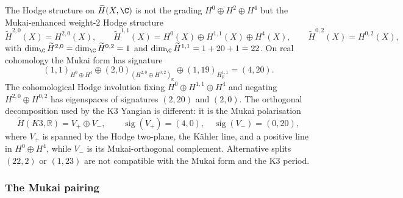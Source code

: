 The Hodge structure on $\widetilde H(X, \C)$ is not the grading $H^0 \oplus H^2 \oplus H^4$ but the Mukai-enhanced weight-$2$ Hodge structure
\[
 \widetilde H^{2, 0}(X) = H^{2, 0}(X), \qquad
 \widetilde H^{1, 1}(X) = H^0(X) \oplus H^{1, 1}(X) \oplus H^4(X), \qquad
 \widetilde H^{0, 2}(X) = H^{0, 2}(X),
\]
with $\dim_\C \widetilde H^{2, 0} = \dim_\C \widetilde H^{0, 2} = 1$ and $\dim_\C \widetilde H^{1, 1} = 1 + 20 + 1 = 22$. On real cohomology the Mukai form has signature
\[
 (1,1)_{H^0\oplus H^4}\oplus
 (2,0)_{(H^{2,0}\oplus H^{0,2})_\mathbb R}\oplus
 (1,19)_{H^{1,1}_\mathbb R}
 = (4,20).
\]
The cohomological Hodge involution fixing \(H^0\oplus H^{1,1}\oplus H^4\) and negating \(H^{2,0}\oplus H^{0,2}\) has eigenspaces of signatures \((2,20)\) and \((2,0)\). The orthogonal decomposition used by the K3 Yangian is different: it is the Mukai polarisation
\[
 \widetilde H(K3,\mathbb R)=V_+\oplus V_-,
 \qquad \operatorname{sig}(V_+)=(4,0),\quad
 \operatorname{sig}(V_-)=(0,20),
\]
where \(V_+\) is spanned by the Hodge two-plane, the K\"ahler line, and a positive line in \(H^0\oplus H^4\), while \(V_-\) is its Mukai-orthogonal complement. Alternative splits \((22,2)\) or \((1,23)\) are not compatible with the Mukai form and the K3 period.

\subsubsection{The Mukai pairing}

